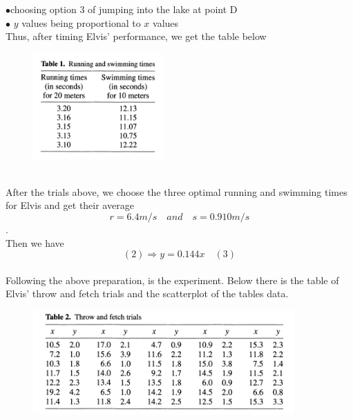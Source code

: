 \documentclass[12pt]{article}
\begin{document}
{$\bullet$choosing option $3$ of jumping into the lake at point D\\
$\bullet$ $y$ values being proportional to $x$ values\\

Thus, after timing Elvis' performance, we get the table below\\
\begin{figure}[h!]
  \begin{center}
  \includegraphics[width=50mm]{experimentTable.png}
  \label{fig:path1}
  \end{center}
\end{figure}\\
After the trials above, we choose the three optimal running and swimming times for Elvis and get their average $$r=6.4m/s \quad and \quad s=0.910m/s$$.\\
Then we have $$(2) \Rightarrow y = 0.144x \quad (3)$$\\ \newpage
Following the above preparation, is the experiment. Below there is the table of Elvis' throw and fetch trials and the scatterplot of the tables data.  
\begin{figure}[h!]
  \begin{center}
  \includegraphics[width=100mm]{throwFetchTrials.png}
  \label{fig:path2}
  \end{center}
\end{figure}\\

}
\end{document}

